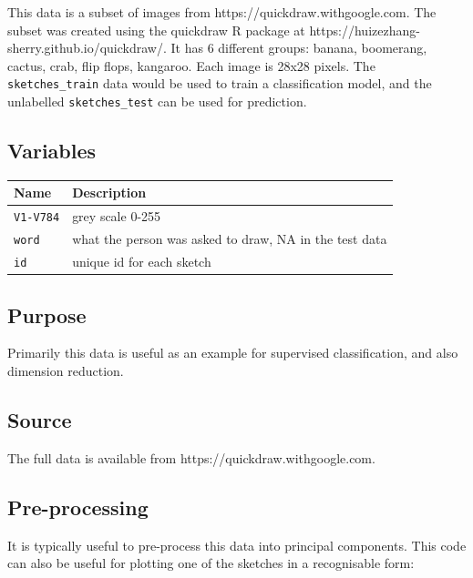\documentclass[
  letterpaper,
]{krantz}
\begin{document}
This data is a subset of images from https://quickdraw.withgoogle.com.
The subset was created using the quickdraw R package at
https://huizezhang-sherry.github.io/quickdraw/. It has 6 different
groups: banana, boomerang, cactus, crab, flip flops, kangaroo. Each
image is 28x28 pixels. The \texttt{sketches\_train} data would be used
to train a classification model, and the unlabelled
\texttt{sketches\_test} can be used for prediction.

\subsection*{Variables}\label{variables-5}

\begin{longtable}[]{@{}ll@{}}
\toprule\noalign{}
Name & Description \\
\midrule\noalign{}
\endhead
\bottomrule\noalign{}
\endlastfoot
\texttt{V1-V784} & grey scale 0-255 \\
\texttt{word} & what the person was asked to draw, NA in the test
data \\
\texttt{id} & unique id for each sketch \\
\end{longtable}

\subsection*{Purpose}\label{purpose-5}

Primarily this data is useful as an example for supervised
classification, and also dimension reduction.

\subsection*{Source}\label{source-5}

The full data is available from https://quickdraw.withgoogle.com.

\subsection*{Pre-processing}\label{pre-processing-5}

It is typically useful to pre-process this data into principal
components. This code can also be useful for plotting one of the
sketches in a recognisable form:
\end{document}
